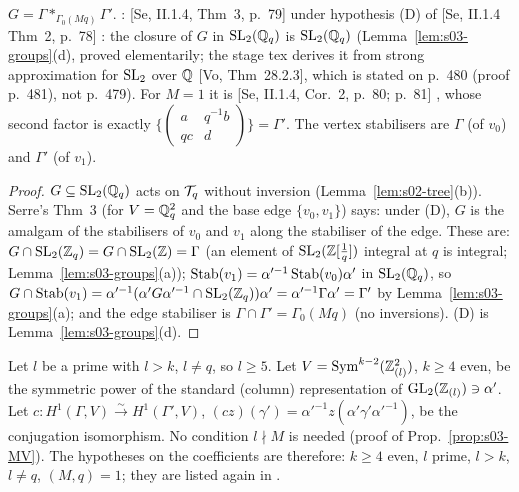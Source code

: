 \begin{proposition}[amalgam]\label{prop:s03-amalgam}
$G=\Gamma*_{\Gamma_0(Mq)}\Gamma'$. \stpmc: [Se, II.1.4, Thm~3, p.~79]  under
hypothesis (D) of [Se, II.1.4 Thm~2, p.~78] : the closure of $G$ in $\mathrm{SL}_2(\mathbb{Q}_q)$ is $\mathrm{SL}_2(\mathbb{Q}_q)$
(Lemma~\ref{lem:s03-groups}(d), proved elementarily; the stage tex derives it from strong approximation for $\mathrm{SL}_2$ over $\mathbb{Q}$ [Vo, Thm~28.2.3], which is stated on
p.~480 (proof p.~481), not p.~479). For $M=1$ it is [Se, II.1.4, Cor.~2, p.~80; p.~81]  \stcited, whose second factor is
exactly $\{(\begin{smallmatrix}a&q^{-1}b\\qc&d\end{smallmatrix})\}=\Gamma'$. The vertex stabilisers are $\Gamma$ (of $v_0$) and $\Gamma'$ (of $v_1$).
\end{proposition}
\begin{proof}
$G\subseteq\mathrm{SL}_2(\mathbb{Q}_q)$ acts on $\mathcal{T}_q$ without inversion (Lemma~\ref{lem:s02-tree}(b)). Serre's Thm~3 (for $V=\mathbb{Q}_q^2$ and the base edge $\{v_0,v_1\}$) says: under (D),
$G$ is the amalgam of the stabilisers of $v_0$ and $v_1$ along the stabiliser of the edge. These are: $G\cap\mathrm{SL}_2(\mathbb{Z}_q)=G\cap\mathrm{SL}_2(\mathbb{Z})=\Gamma$ (an element of
$\mathrm{SL}_2(\mathbb{Z}[\frac1q])$ integral at $q$ is integral; Lemma~\ref{lem:s03-groups}(a)); $\operatorname{Stab}(v_1)=\alpha'^{-1}\operatorname{Stab}(v_0)\alpha'$ in $\mathrm{SL}_2(\mathbb{Q}_q)$, so
$G\cap\operatorname{Stab}(v_1)=\alpha'^{-1}(\alpha'G\alpha'^{-1}\cap\mathrm{SL}_2(\mathbb{Z}_q))\alpha'=\alpha'^{-1}\Gamma\alpha'=\Gamma'$ by Lemma~\ref{lem:s03-groups}(a); and the edge stabiliser is
$\Gamma\cap\Gamma'=\Gamma_0(Mq)$ (no inversions). (D) is Lemma~\ref{lem:s03-groups}(d).
\end{proof}

Let $l$ be a prime with $l>k$, $l\ne q$, so $l\ge5$. Let $V=\mathrm{Sym}^{k-2}(\mathbb{Z}_{(l)}^2)$, $k\ge4$ even, be the symmetric power of the
standard (column) representation of $\mathrm{GL}_2(\mathbb{Z}_{(l)})\ni\alpha'$. Let $c:H^1(\Gamma,V)\xrightarrow\sim H^1(\Gamma',V)$,
$(cz)(\gamma')=\alpha'^{-1}z(\alpha'\gamma'\alpha'^{-1})$, be the conjugation isomorphism.
No condition $l\nmid M$ is needed (proof of Prop.~\ref{prop:s03-MV}). The hypotheses on the coefficients are therefore: $k\ge4$ even, $l$ prime,
$l>k$, $l\ne q$, $(M,q)=1$; they are listed again in .

